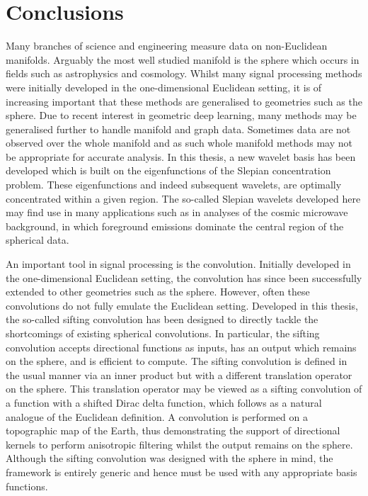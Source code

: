 \chapter{Conclusions}\label{sec:chapter6}

Many branches of science and engineering measure data on non-Euclidean manifolds.
Arguably the most well studied manifold is the sphere which occurs in fields such as astrophysics and cosmology.
Whilst many signal processing methods were initially developed in the one-dimensional Euclidean setting, it is of increasing important that these methods are generalised to geometries such as the sphere.
Due to recent interest in geometric deep learning, many methods may be generalised further to handle manifold and graph data.
Sometimes data are not observed over the whole manifold and as such whole manifold methods may not be appropriate for accurate analysis.
In this thesis, a new wavelet basis has been developed which is built on the eigenfunctions of the Slepian concentration problem.
These eigenfunctions and indeed subsequent wavelets, are optimally concentrated within a given region.
The so-called Slepian wavelets developed here may find use in many applications such as in analyses of the cosmic microwave background, in which foreground emissions dominate the central region of the spherical data.

An important tool in signal processing is the convolution.
Initially developed in the one-dimensional Euclidean setting, the convolution has since been successfully extended to other geometries such as the sphere.
However, often these convolutions do not fully emulate the Euclidean setting.
Developed in this thesis, the so-called sifting convolution has been designed to directly tackle the shortcomings of existing spherical convolutions.
In particular, the sifting convolution accepts directional functions as inputs, has an output which remains on the sphere, and is efficient to compute.
The sifting convolution is defined in the usual manner via an inner product but with a different translation operator on the sphere.
This translation operator may be viewed as a sifting convolution of a function with a shifted Dirac delta function, which follows as a natural analogue of the Euclidean definition.
A convolution is performed on a topographic map of the Earth, thus demonstrating the support of directional kernels to perform anisotropic filtering whilst the output remains on the sphere.
Although the sifting convolution was designed with the sphere in mind, the framework is entirely generic and hence must be used with any appropriate basis functions.
